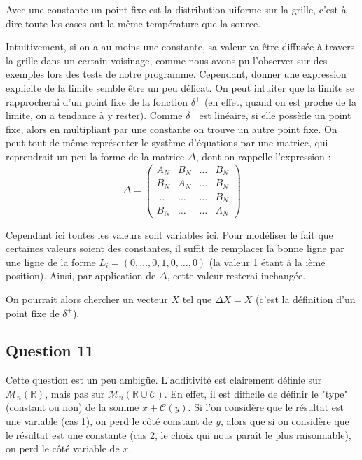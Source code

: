 \documentclass{article}
\begin{document}
Avec une constante un point fixe est la distribution uiforme sur la grille, c'est à dire toute les cases ont la même température que la source. 

Intuitivement, si on a au moins une constante, sa valeur va être diffusée à travers la grille dans un certain voisinage, comme nous avons pu l'observer sur des exemples lors des tests de notre programme.
Cependant, donner une expression explicite de la limite semble être un peu délicat. On peut intuiter que la limite se rapprocherai d'un point fixe de la fonction $\delta^+$ (en effet, quand on est proche de la limite, on a tendance à y rester). Comme $\delta^+$ est linéaire, si elle possède un point fixe, alors en multipliant par une constante on trouve un autre point fixe. On peut tout de même représenter le système d'équations par une matrice, qui reprendrait un peu la forme de la matrice $\Delta$, dont on rappelle l'expression :
$$ \Delta = 
	\left(\begin{array}{c|c|c|c}
    A_N & B_N & \dots & B_N  \\
	\hline
	B_N & A_N & \dots & B_N \\
	\hline
	\dots & \dots & \dots & B_N \\
	\hline
	B_N & \dots & \dots & A_N
	\end{array} \right)$$

Cependant ici toutes les valeurs sont variables ici. Pour modéliser le fait que certaines valeurs soient des constantes, il suffit de remplacer la bonne ligne par une ligne de la forme $L_i = \left( 0, \dots, 0, 1, 0, \dots, 0 \right)$ (la valeur 1 étant à la ième position). Ainsi, par application de $\Delta$, cette valeur resterai inchangée.

On pourrait alors chercher un vecteur $X$ tel que $\Delta X = X$ (c'est la définition d'un point fixe de $\delta^+$).


\subsection*{Question 11}

Cette question est un peu ambigüe. L'additivité est clairement définie sur $\mathcal{M}_n(\mathbb{R})$, mais pas sur $\mathcal{M}_n(\mathbb{R} \cup \mathcal{C})$. En effet, il est difficile de définir le "type" (constant ou non) de la somme $x + \mathcal{C}(y)$. Si l'on considère que le résultat est une variable (cas 1), on perd le côté constant de $y$, alors que si on considère que le résultat est une constante (cas 2, le choix qui nous paraît le plus raisonnable), on perd le côté variable de $x$.
\end{document}
